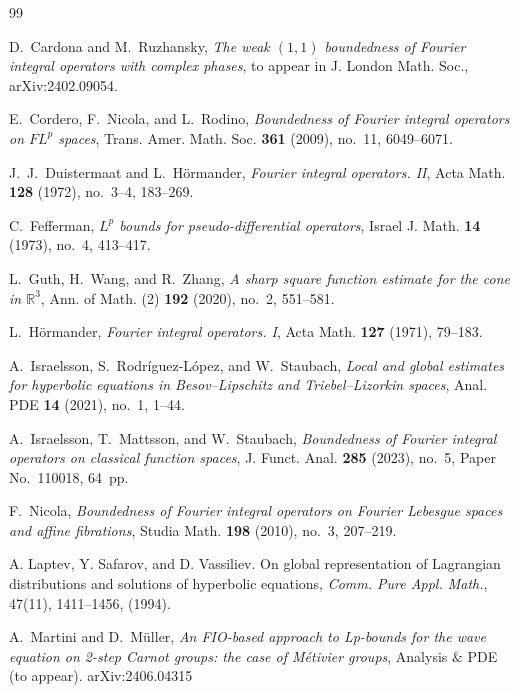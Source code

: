 \documentclass[12pt, reqno]{amsart}
\theoremstyle{definition}
\theoremstyle{remark}
\numberwithin{equation}{section}
\begin{document}

\begin{thebibliography}{99}

D.~Cardona and M.~Ruzhansky,
\emph{The weak $(1,1)$ boundedness of Fourier integral operators with complex phases},
to appear in J. London Math. Soc., arXiv:2402.09054.

E.~Cordero, F.~Nicola, and L.~Rodino,
\emph{Boundedness of Fourier integral operators on $FL^p$ spaces},
Trans. Amer. Math. Soc. \textbf{361} (2009), no.~11, 6049--6071.

J.~J.~Duistermaat and L.~H{\"o}rmander,
\emph{Fourier integral operators. II},
Acta Math. \textbf{128} (1972), no.~3--4, 183--269.

C.~Fefferman,
\emph{$L^p$ bounds for pseudo-differential operators},
Israel J. Math. \textbf{14} (1973), no.~4, 413--417.


L.~Guth, H.~Wang, and R.~Zhang,
\emph{A sharp square function estimate for the cone in $\mathbb{R}^3$},
Ann. of Math. (2) \textbf{192} (2020), no.~2, 551--581.

L.~H{\"o}rmander,
\emph{Fourier integral operators. I},
Acta Math. \textbf{127} (1971), 79--183.

A.~Israelsson, S.~Rodríguez-López, and W.~Staubach,
\emph{Local and global estimates for hyperbolic equations in Besov--Lipschitz and Triebel--Lizorkin spaces},
Anal. PDE \textbf{14} (2021), no.~1, 1--44.

A.~Israelsson, T.~Mattsson, and W.~Staubach,
\emph{Boundedness of Fourier integral operators on classical function spaces},
J. Funct. Anal. \textbf{285} (2023), no.~5, Paper No.~110018, 64~pp.

F.~Nicola,
\emph{Boundedness of Fourier integral operators on Fourier Lebesgue spaces and affine fibrations},
Studia Math. \textbf{198} (2010), no.~3, 207--219.

  A. Laptev, Y. Safarov, and D.  Vassiliev. On global representation of Lagrangian distributions
and solutions of hyperbolic equations, {\it Comm. Pure Appl. Math.}, 47(11), 1411--1456, (1994).

A.~Martini and D.~M{\"u}ller,
\emph{ An FIO-based approach to Lp-bounds for the wave equation on 2-step Carnot groups: the case of Métivier groups},
Analysis $\&$ PDE (to appear). arXiv:2406.04315


\end{thebibliography}
\end{document}
